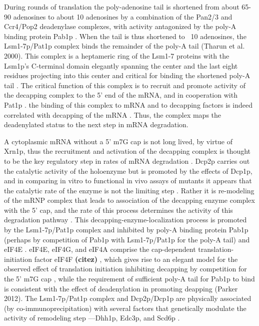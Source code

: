 During rounds of
translation the poly-adenosine tail is shortened from about 65-90
adenosines to about 10 adenosines by a combination of the Pan2/3 and
Ccr4/Pop2 deadenylase complexes, with activity antagonized by the
poly-A binding protein Pab1p
\parencite{parker2012rna,decker1993turnover}.
When the tail is thus shortened to ~10 adenosines, the Lsm1-7p/Pat1p
complex binds the remainder of the poly-A tail (Tharun et al. 2000).
This complex is a heptameric ring of the Lsm1-7 proteins with the
Lsm1p’s C-terminal domain elegantly spanning the center 
\parencite{sharif2013architecture}
and the last eight residues projecting into this center
and critical for binding the shortened poly-A tail 
\parencite{chowdhury2016mutagenic}.
The critical function of this complex is to recruit and promote
activity of the decapping complex to the 5’ end of the mRNA, and in
cooperation with Pat1p \parencite{chowdhury2014pat1}.
the binding of this
complex to mRNA and to decapping factors is indeed correlated with
decapping of the mRNA 
\parencite{chowdhury2009activation}.
Thus, the complex
maps the deadenylated status to the next step in mRNA degradation.  

A
cytoplasmic mRNA without a 5’ m7G cap is not long lived, by virtue of
Xrn1p, thus the recruitment and activation of the decapping complex is
thought to be the key regulatory step in rates of mRNA degradation
\parencite{coller2004eukaryotic}.
Dcp2p carries out the catalytic activity of
the holoenzyme but is promoted by the effects of Dcp1p, and in
comparing in vitro to functional in vivo assays of mutants it appears
that the catalytic rate of the enzyme is not the limiting step 
\parencite{tharun1999analysis}. 
Rather it is re-modeling of the mRNP complex that
leads to association of the decapping enzyme complex with the 5’ cap,
and the rate of this process determines the activity of this
degradation pathway 
\parencite{tharun2001targeting}.
This
decapping-enzyme-localization process is promoted by the Lsm1-7p/Pat1p
complex and inhibited by poly-A binding protein Pab1p (perhaps by
competition of Pab1p with Lsm1-7p/Pat1p for the poly-A tail) and eIF4E
\parencite{coller2004eukaryotic,caponigro1996mechanisms}
. eIF4E, eIF4G, and
eIF4A comprise the cap-dependent translation-initiation factor eIF4F
\textbf{(citez)}
, which gives rise to an elegant model for the observed effect
of translation initiation inhibiting decapping by competition for the
5’ m7G cap 
\parencite{huch2014interrelations},
while the requirement of sufficient
poly-A tail for Pab1p to bind is consistent with the effect of
deadenylation in promoting deapping (Parker 2012). The Lsm1-7p/Pat1p
complex and Dcp2p/Dcp1p are physically associated (by
co-immunoprecipitation) with several factors that genetically modulate
the activity of remodeling step ---Dhh1p, Edc3p, and Scd6p 
\parencite{nissan2010decapping}.

